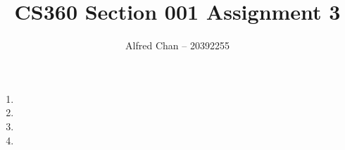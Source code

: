 \documentclass[12pt]{article}
\title{CS360 Section 001 Assignment 3}
\author{Alfred Chan -- 20392255}
\begin{document}
\maketitle

\begin{enumerate}
\item
\item
\item
\item
\end{enumerate}
\end{document}
